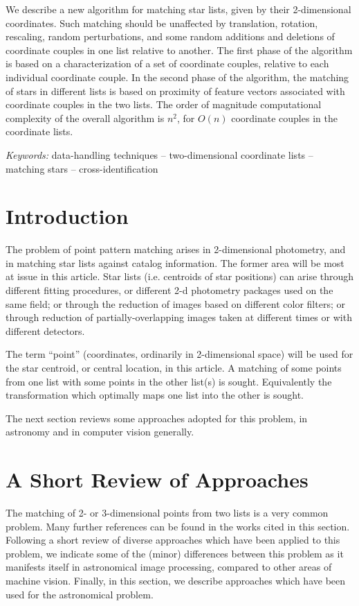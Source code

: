 We describe a new algorithm for matching star lists, given by their 
2-dimensional coordinates.  Such matching should be unaffected by translation,
rotation, rescaling, random perturbations, and some random additions and 
deletions of
coordinate couples in one list relative to another.  The first phase of the
algorithm is based on a characterization of a set of coordinate couples,
relative to each individual coordinate couple.  In the second phase of the 
algorithm, the matching of stars in different lists is based on proximity
of feature vectors associated with coordinate couples in the two lists.
The order of magnitude computational complexity of the overall algorithm
is $n^2$, for $O(n)$ coordinate couples in the coordinate lists.

\medskip

{\it Keywords:} data-handling techniques -- two-dimensional coordinate lists 
-- matching stars -- cross-identification

\section{Introduction}

The problem of point pattern matching arises in 2-dimensional photometry,
and in matching star lists against catalog information.  The former area
will be most at issue in this article.  Star lists (i.e. centroids of
star positions) can arise through different fitting procedures, or 
different 2-d photometry packages used on the same field; or through 
the reduction of images based on different color filters; 
or through reduction of partially-overlapping images taken at different
times or with different detectors.

The term ``point'' (coordinates, ordinarily in 2-dimensional space) 
will be used for the 
star centroid, or central location, in this article.
A matching of some points from one list with some points in the 
other list(s) is sought.  Equivalently the transformation which optimally 
maps one list into the other is sought.  

The next section reviews some approaches adopted for this problem, in 
astronomy and in computer vision generally.

\section{A Short Review of Approaches}

The matching of 2- or 3-dimensional points from two lists is a very common
problem.  Many further references can be found in
the works cited in this section. Following a short review of 
diverse approaches which 
have been applied to this problem, we indicate some of the (minor)
differences between this problem as it manifests itself in astronomical
image processing, compared to other areas of machine vision.  Finally,
in this section, we describe approaches which have been used for the
astronomical problem.

